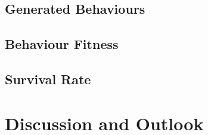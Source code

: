 \documentclass[a4paper, twocolumn]{article}
\begin{document}
        \subsection{Generated Behaviours} \label{sec:generated_behaviours}



        \subsection{Behaviour Fitness} \label{sec:behaviour_fitness}



        \subsection{Survival Rate} \label{sec:survival_rate}



    \section{Discussion and Outlook} \label{sec:discussion_and_outlook}
\end{document}

